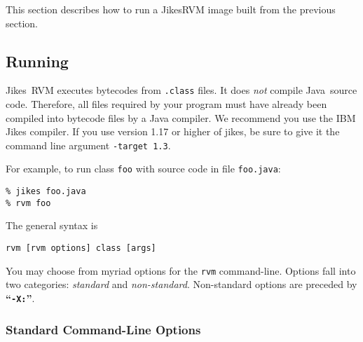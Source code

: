This section describes how to run a Jikes\trademark RVM  image built
from the previous section. 

\subsection{Running \jrvm}

Jikes\trademark\ RVM executes bytecodes from {\tt .class} files. It does {\em
not} compile 
Java\trademark\ source code. Therefore, all files 
required by your program must have already been compiled into bytecode
files by a Java compiler.  We recommend you use the IBM Jikes
compiler. If you use version 1.17 or higher of jikes, be sure to give
it the command line argument {\tt -target 1.3}.

For example, to run class {\tt foo} with source code in file {\tt foo.java}:
\begin{verbatim}
% jikes foo.java
% rvm foo 
\end{verbatim}

The general syntax is
\begin{verbatim}
rvm [rvm options] class [args]
\end{verbatim}

You may choose from myriad options for the {\tt rvm} command-line.  
Options fall into two categories: {\em standard} and {\em
non-standard}.  Non-standard options are preceded by {\bf ``{\tt -X:}''}.

\subsubsection{Standard Command-Line Options}

